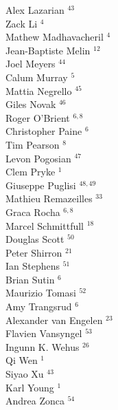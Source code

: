 \documentclass[PICOAPC.tex]{subfiles}
\begin{document}
{\begin{multicols}{4}
Alex Lazarian $^{43}$                   \\
Zack Li $^{4}$                         \\
Mathew Madhavacheril $^{4}$            \\
Jean-Baptiste Melin $^{12}$             \\
Joel Meyers $^{44}$                     \\
Calum Murray $^{5}$                    \\
Mattia Negrello $^{45}$                 \\
Giles Novak $^{46}$                     \\
Roger O'Brient $^{6,8}$                  \\
Christopher Paine $^{6}$               \\
Tim Pearson $^{8}$                     \\
Levon Pogosian $^{47}$                  \\
Clem Pryke $^{1}$                      \\
Giuseppe Puglisi $^{48,49}$                \\
Mathieu Remazeilles $^{33}$             \\
Graca Rocha $^{6,8}$                     \\
Marcel Schmittfull $^{18}$              \\
Douglas Scott $^{50}$                   \\
Peter Shirron $^{21}$                   \\
Ian Stephens $^{51}$                    \\
Brian Sutin $^{6}$                     \\
Maurizio Tomasi $^{52}$                 \\
Amy Trangsrud $^{6}$                   \\
Alexander van Engelen $^{23}$           \\
Flavien Vansyngel $^{53}$               \\
Ingunn K. Wehus $^{26}$                 \\
Qi Wen $^{1}$                          \\
Siyao Xu $^{43}$                        \\
Karl Young $^{1}$                      \\
Andrea Zonca $^{54}$
\end{multicols}
}
\end{document}
